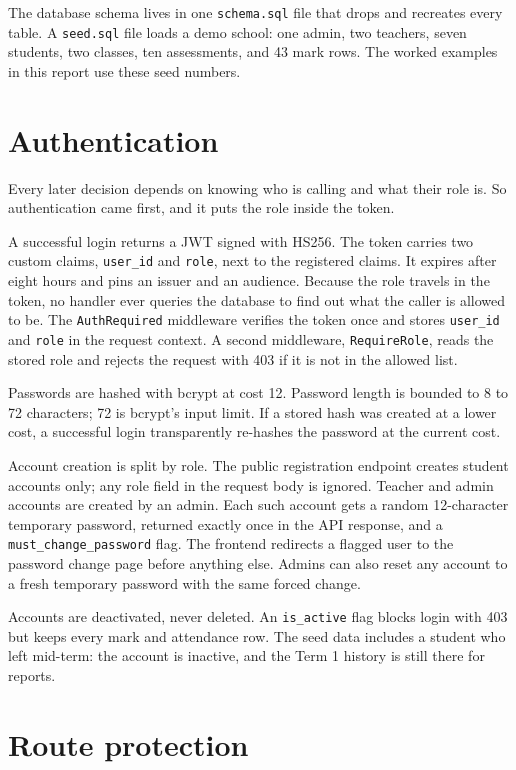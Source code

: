\documentclass[11pt,a4paper]{article}
\begin{document}
The database schema lives in one \texttt{schema.sql} file that drops and recreates every table. A \texttt{seed.sql} file loads a demo school: one admin, two teachers, seven students, two classes, ten assessments, and 43 mark rows. The worked examples in this report use these seed numbers.

\section{Authentication}

Every later decision depends on knowing who is calling and what their role is. So authentication came first, and it puts the role inside the token.

A successful login returns a JWT signed with HS256. The token carries two custom claims, \texttt{user\_id} and \texttt{role}, next to the registered claims. It expires after eight hours and pins an issuer and an audience. Because the role travels in the token, no handler ever queries the database to find out what the caller is allowed to be. The \texttt{AuthRequired} middleware verifies the token once and stores \texttt{user\_id} and \texttt{role} in the request context. A second middleware, \texttt{RequireRole}, reads the stored role and rejects the request with 403 if it is not in the allowed list.

Passwords are hashed with bcrypt at cost 12. Password length is bounded to 8 to 72 characters; 72 is bcrypt's input limit. If a stored hash was created at a lower cost, a successful login transparently re-hashes the password at the current cost.

Account creation is split by role. The public registration endpoint creates student accounts only; any role field in the request body is ignored. Teacher and admin accounts are created by an admin. Each such account gets a random 12-character temporary password, returned exactly once in the API response, and a \texttt{must\_change\_password} flag. The frontend redirects a flagged user to the password change page before anything else. Admins can also reset any account to a fresh temporary password with the same forced change.

Accounts are deactivated, never deleted. An \texttt{is\_active} flag blocks login with 403 but keeps every mark and attendance row. The seed data includes a student who left mid-term: the account is inactive, and the Term 1 history is still there for reports.

\section{Route protection}
\end{document}
